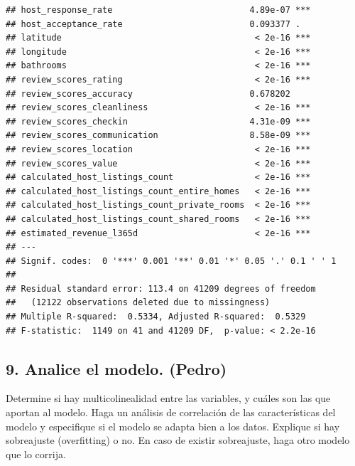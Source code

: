 \documentclass[
]{article}
\newenvironment{Shaded}{\begin{snugshade}}{\end{snugshade}}
\newcommand{\AttributeTok}[1]{\textcolor[rgb]{0.13,0.29,0.53}{#1}}
\newcommand{\FunctionTok}[1]{\textcolor[rgb]{0.13,0.29,0.53}{\textbf{#1}}}
\newcommand{\NormalTok}[1]{#1}
\newcommand{\OtherTok}[1]{\textcolor[rgb]{0.56,0.35,0.01}{#1}}
\newcommand{\SpecialCharTok}[1]{\textcolor[rgb]{0.81,0.36,0.00}{\textbf{#1}}}
\begin{document}
\begin{verbatim}
## host_response_rate                           4.89e-07 ***
## host_acceptance_rate                         0.093377 .  
## latitude                                      < 2e-16 ***
## longitude                                     < 2e-16 ***
## bathrooms                                     < 2e-16 ***
## review_scores_rating                          < 2e-16 ***
## review_scores_accuracy                       0.678202    
## review_scores_cleanliness                     < 2e-16 ***
## review_scores_checkin                        4.31e-09 ***
## review_scores_communication                  8.58e-09 ***
## review_scores_location                        < 2e-16 ***
## review_scores_value                           < 2e-16 ***
## calculated_host_listings_count                < 2e-16 ***
## calculated_host_listings_count_entire_homes   < 2e-16 ***
## calculated_host_listings_count_private_rooms  < 2e-16 ***
## calculated_host_listings_count_shared_rooms   < 2e-16 ***
## estimated_revenue_l365d                       < 2e-16 ***
## ---
## Signif. codes:  0 '***' 0.001 '**' 0.01 '*' 0.05 '.' 0.1 ' ' 1
## 
## Residual standard error: 113.4 on 41209 degrees of freedom
##   (12122 observations deleted due to missingness)
## Multiple R-squared:  0.5334, Adjusted R-squared:  0.5329 
## F-statistic:  1149 on 41 and 41209 DF,  p-value: < 2.2e-16
\end{verbatim}

\begin{Shaded}
\end{Shaded}

\subsection{9. Analice el modelo.
(Pedro)}\label{analice-el-modelo.-pedro}

Determine si hay multicolinealidad entre las variables, y cuáles son las
que aportan al modelo. Haga un análisis de correlación de las
características del modelo y especifique si el modelo se adapta bien a
los datos. Explique si hay sobreajuste (overfitting) o no. En caso de
existir sobreajuste, haga otro modelo que lo corrija.
\end{document}
